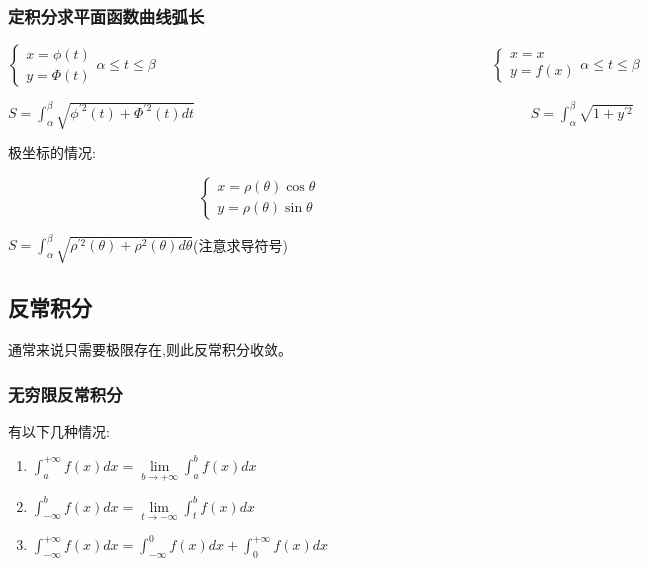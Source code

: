 \documentclass[UTF8]{ctexbook}
\newcommand{\limNormal}[1]{\lim\limits_{#1}}
\newcommand{\defFunction}[1]{f(#1)}
\newcommand{\definiteIntegral}[2]{\int^{#1}_{#2}}
\begin{document}
{{{{}%

\subsubsection{定积分求平面函数曲线弧长}{

  $$
    \begin{cases}
      x = \phi(t) \\
      y = \Phi(t)
    \end{cases}
    \alpha \leq t \leq \beta
    \qquad\qquad\qquad\qquad\qquad\qquad\qquad\qquad\qquad\qquad\qquad\qquad
    \begin{cases}
      x = x \\
      y = \defFunction{x}
    \end{cases}
    \alpha \leq t \leq \beta
  $$

  $S = \definiteIntegral{\beta}{\alpha}\sqrt{\phi^{\prime 2}(t) + \Phi^{\prime 2}(t) dt}\qquad\qquad\qquad\qquad\qquad\qquad\qquad\qquad\qquad\qquad\qquad\qquad S = \definiteIntegral{\beta}{\alpha}\sqrt{1 + y^{\prime 2}}$

  极坐标的情况:

  $$
    \begin{cases}
      x = \rho(\theta)\cos\theta \\
      y = \rho(\theta)\sin\theta
    \end{cases}
  $$

  $S = \definiteIntegral{\beta}{\alpha}\sqrt{\rho^{\prime 2}(\theta) + \rho^2(\theta)d\theta}$\qquad(注意求导符号)
}%

}%

\subsection{反常积分}{
通常来说只需要极限存在,则此反常积分收敛。

\subsubsection{无穷限反常积分}{

  有以下几种情况:

  \begin{enumerate}
    \item $\definiteIntegral{+\infty}{a}\defFunction{x}dx = \limNormal{b \to +\infty}\definiteIntegral{b}{a}\defFunction{x}dx$
    \item $\definiteIntegral{b}{-\infty}\defFunction{x}dx = \limNormal{t \to -\infty}\definiteIntegral{b}{t}\defFunction{x}dx$
    \item $\definiteIntegral{+\infty}{-\infty}\defFunction{x}dx = \definiteIntegral{0}{-\infty}\defFunction{x}dx + \definiteIntegral{+\infty}{0}\defFunction{x}dx$
  \end{enumerate}
}%


}}}
\end{document}
